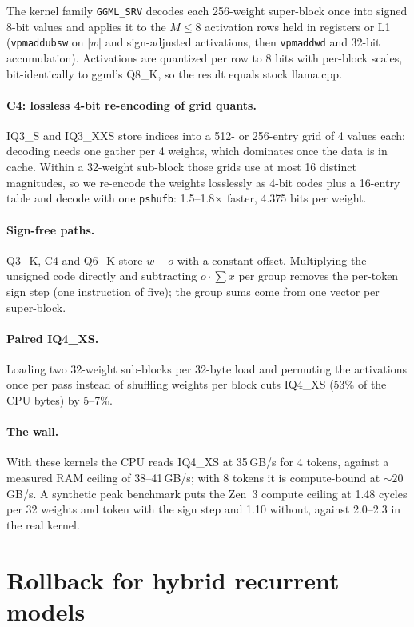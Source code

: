 \documentclass[10pt]{article}
\begin{document}
The kernel family \texttt{GGML\_SRV} decodes each 256-weight super-block once into signed 8-bit values and applies it to
the $M\le8$ activation rows held in registers or L1 (\texttt{vpmaddubsw} on $|w|$ and sign-adjusted activations,
then \texttt{vpmaddwd} and 32-bit accumulation). Activations are quantized per row to 8 bits with per-block scales,
bit-identically to ggml's Q8\_K, so the result equals stock llama.cpp.

\paragraph{C4: lossless 4-bit re-encoding of grid quants.} IQ3\_S and IQ3\_XXS store indices into a 512- or
256-entry grid of 4 values each; decoding needs one gather per 4 weights, which dominates once the data is in cache.
Within a 32-weight sub-block those grids use at most 16 distinct magnitudes, so we re-encode the weights losslessly as
4-bit codes plus a 16-entry table and decode with one \texttt{pshufb}: 1.5--1.8$\times$ faster, 4.375 bits per weight.

\paragraph{Sign-free paths.} Q3\_K, C4 and Q6\_K store $w+o$ with a constant offset. Multiplying the unsigned code
directly and subtracting $o\cdot\sum x$ per group removes the per-token sign step (one instruction of five);
the group sums come from one vector per super-block.

\paragraph{Paired IQ4\_XS.} Loading two 32-weight sub-blocks per 32-byte load and permuting the activations once per
pass instead of shuffling weights per block cuts IQ4\_XS (53\% of the CPU bytes) by 5--7\%.

\paragraph{The wall.} With these kernels the CPU reads IQ4\_XS at 35\,GB/s for 4 tokens, against a measured RAM
ceiling of 38--41\,GB/s; with 8 tokens it is compute-bound at ${\sim}20$\,GB/s. A synthetic peak benchmark puts the
Zen~3 compute ceiling at 1.48 cycles per 32 weights and token with the sign step and 1.10 without, against 2.0--2.3
in the real kernel.

\section{Rollback for hybrid recurrent models}\label{sec:recurrent}
\end{document}
